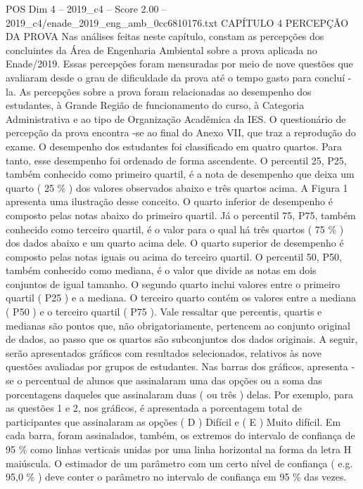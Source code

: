 \begin{textsample}{POS Dim 4 – 2019\_c4 – Score 2.00 – 2019\_c4/enade\_2019\_eng\_amb\_0cc6810176.txt}  \label{ex:f4_pos_111}
CAPÍTULO 4 PERCEPÇÃO DA PROVA Nas análises feitas neste capítulo, constam as percepções dos concluintes da Área de Engenharia Ambiental sobre a prova aplicada no Enade/2019.
Essas percepções foram mensuradas por meio de nove questões que avaliaram desde o grau de dificuldade da prova até o tempo gasto para concluí -la.
As percepções sobre a prova foram relacionadas ao desempenho dos estudantes, à Grande Região de funcionamento do curso, à Categoria Administrativa e ao tipo de Organização Acadêmica da IES.
O questionário de percepção da prova encontra -se ao final do Anexo VII, que traz a reprodução do exame.
O desempenho dos estudantes foi classificado em quatro quartos.
Para tanto, esse desempenho foi ordenado de forma ascendente.
O percentil 25, P25, também conhecido como primeiro quartil, é a nota de desempenho que deixa um quarto ( 25 \% ) dos valores observados abaixo e três quartos acima.
A Figura 1 apresenta uma ilustração desse conceito.
O quarto inferior de desempenho é composto pelas notas abaixo do primeiro quartil.
Já o percentil 75, P75, também conhecido como terceiro quartil, é o valor para o qual há três quartos ( 75 \% ) dos dados abaixo e um quarto acima dele.
O quarto superior de desempenho é composto pelas notas iguais ou acima do terceiro quartil.
O percentil 50, P50, também conhecido como mediana, é o valor que divide as notas em dois conjuntos de igual tamanho.
O segundo quarto inclui valores entre o primeiro quartil ( P25 ) e a mediana.
O terceiro quarto contém os valores entre a mediana ( P50 ) e o terceiro quartil ( P75 ).
Vale ressaltar que percentis, quartis e medianas são pontos que, não obrigatoriamente, pertencem ao conjunto original de dados, ao passo que os quartos são subconjuntos dos dados originais.
A seguir, serão apresentados gráficos com resultados selecionados, relativos às nove questões avaliadas por grupos de estudantes.
Nas barras dos gráficos, apresenta -se o percentual de alunos que assinalaram uma das opções ou a soma das porcentagens daqueles que assinalaram duas ( ou três ) delas.
Por exemplo, para as questões 1 e 2, nos gráficos, é apresentada a porcentagem total de participantes que assinalaram as opções ( D ) Difícil e ( E ) Muito difícil.
Em cada barra, foram assinalados, também, os extremos do intervalo de confiança de 95 \% como linhas verticais unidas por uma linha horizontal na forma da letra H maiúscula.
O estimador de um parâmetro com um certo nível de confiança ( e.g. 95,0 \% ) deve conter o parâmetro no intervalo de confiança em 95 \% das vezes.

\end{textsample}
